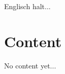 \documentclass[../main.tex]{subfiles}
\begin{document}
    Englisch halt...
    \clearpage

    \section{Content}
        No content yet...
\end{document}
